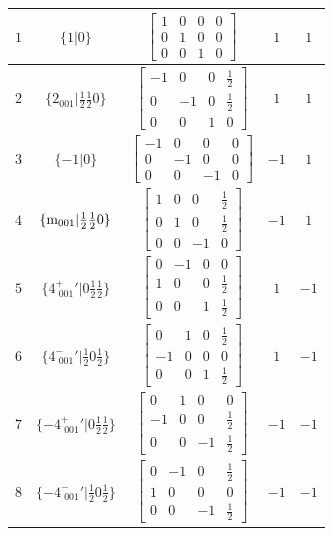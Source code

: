 \documentclass[fleqn,8pt]{jsarticle}
\begin{document}
\begin{longtable}{ccccc}
$ 1 $ & $ \{1|0\} $ & $ \begin{bmatrix} 1 & 0 & 0 & 0 \\ 0 & 1 & 0 & 0 \\ 0 & 0 & 1 & 0 \end{bmatrix} $ & $ 1 $ & $ 1 $ \\ \hline
$ 2 $ & $ \{2{}_{001}|\frac{1}{2} \frac{1}{2} 0\} $ & $ \begin{bmatrix} -1 & 0 & 0 & \frac{1}{2} \\ 0 & -1 & 0 & \frac{1}{2} \\ 0 & 0 & 1 & 0 \end{bmatrix} $ & $ 1 $ & $ 1 $ \\ \hline
$ 3 $ & $ \{-1|0\} $ & $ \begin{bmatrix} -1 & 0 & 0 & 0 \\ 0 & -1 & 0 & 0 \\ 0 & 0 & -1 & 0 \end{bmatrix} $ & $ -1 $ & $ 1 $ \\ \hline
$ 4 $ & $ \{{\rm m}_{001}|\frac{1}{2} \frac{1}{2} 0\} $ & $ \begin{bmatrix} 1 & 0 & 0 & \frac{1}{2} \\ 0 & 1 & 0 & \frac{1}{2} \\ 0 & 0 & -1 & 0 \end{bmatrix} $ & $ -1 $ & $ 1 $ \\ \hline
$ 5 $ & $ \{4^{+}_{\,\,001}{}'|0 \frac{1}{2} \frac{1}{2}\} $ & $ \begin{bmatrix} 0 & -1 & 0 & 0 \\ 1 & 0 & 0 & \frac{1}{2} \\ 0 & 0 & 1 & \frac{1}{2} \end{bmatrix} $ & $ 1 $ & $ -1 $ \\ \hline
$ 6 $ & $ \{4^{-}_{\,\,001}{}'|\frac{1}{2} 0 \frac{1}{2}\} $ & $ \begin{bmatrix} 0 & 1 & 0 & \frac{1}{2} \\ -1 & 0 & 0 & 0 \\ 0 & 0 & 1 & \frac{1}{2} \end{bmatrix} $ & $ 1 $ & $ -1 $ \\ \hline
$ 7 $ & $ \{-4^{+}_{\,\,001}{}'|0 \frac{1}{2} \frac{1}{2}\} $ & $ \begin{bmatrix} 0 & 1 & 0 & 0 \\ -1 & 0 & 0 & \frac{1}{2} \\ 0 & 0 & -1 & \frac{1}{2} \end{bmatrix} $ & $ -1 $ & $ -1 $ \\ \hline
$ 8 $ & $ \{-4^{-}_{\,\,001}{}'|\frac{1}{2} 0 \frac{1}{2}\} $ & $ \begin{bmatrix} 0 & -1 & 0 & \frac{1}{2} \\ 1 & 0 & 0 & 0 \\ 0 & 0 & -1 & \frac{1}{2} \end{bmatrix} $ & $ -1 $ & $ -1 $ \\
\end{longtable}
\end{document}
